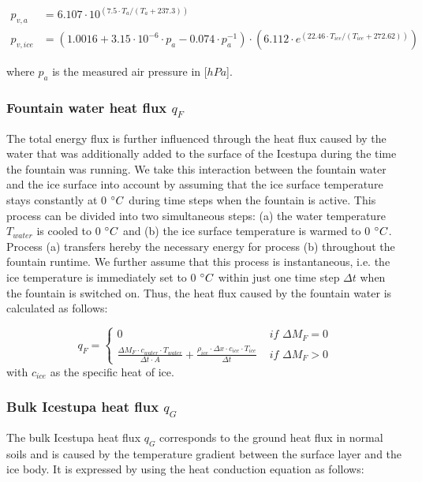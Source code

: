 \documentclass[utf8]{frontiersSCNS} %
\begin{document}
\begin{equation} \begin{split} p_{v,a}&=6.107 \cdot 10^{(7.5 \cdot T_a / (T_a + 237.3))}\\ p_{v,ice}&=(1.0016 +
3.15\cdot10^{-6}\cdot p_{a}-0.074\cdot p_{a}^{-1})\cdot(6.112 \cdot e^{(22.46 \cdot T_{ice} / (T_{ice} + 272.62))})
\end{split} \label{eqn:vp} \end{equation}

where $p_{a}$ is the measured air pressure in [$hPa$]. 
\subsubsection{Fountain water heat flux $q_{F}$ }

The total energy flux is further influenced through the heat flux caused by the water that was additionally added to
the surface of the Icestupa during the time the fountain was running. We take this interaction between the fountain
water and the ice surface into account by assuming that the ice surface temperature stays constantly at 0 $\degree C$
during time steps when the fountain is active. This process can be divided into two simultaneous steps: (a) the water
temperature $T_{water}$ is cooled to 0 $\degree C$ and (b) the ice surface temperature is warmed to 0 $\degree C$.
Process (a) transfers hereby the necessary energy for process (b) throughout the fountain runtime. We further assume
that this process is instantaneous, i.e. the ice temperature is immediately set to 0 $\degree C$ within just one time
step $\Delta t$ when the fountain is switched on. Thus, the heat flux caused by the fountain water is calculated as
follows:

\begin{equation} q_{F} = \left\{ \begin{array}{ll}
        
         0 & \textit{ if } \Delta M_{F} = 0\\ \frac{ \Delta M_F \cdot c_{water} \cdot T_{water}}{\Delta t \cdot A} +
         \frac{\rho_{ice} \cdot \Delta x \cdot c_{ice} \cdot T_{ice}}{\Delta t} & \textit{ if } \Delta M_{F} > 0 
         
    \end{array} \right.  \label{eqn:qF} \end{equation} with $c_{ice}$ as the specific heat of ice. 

\subsubsection{Bulk Icestupa heat flux $q_{G}$} \label{sec:Bulkflux}
The bulk Icestupa heat flux $q_{G}$ corresponds to the ground heat flux in normal soils and is caused by the
temperature gradient between the surface layer and the ice body. It is expressed by using the heat conduction equation
as follows:
\end{document}
